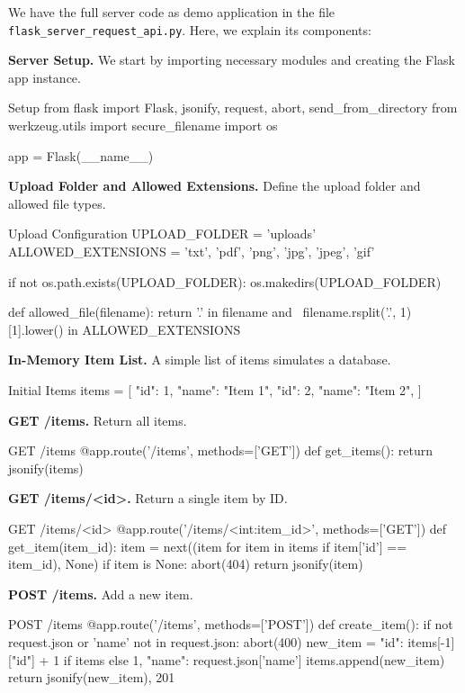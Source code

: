 We have the full server code as demo application in the file \texttt{flask\_server\_request\_api.py}. Here, we explain its components: 

{\bf Server Setup.} We start by importing necessary modules and creating the Flask app instance.

\begin{codeonly}{Setup}
from flask import Flask, jsonify, request, abort, send_from_directory
from werkzeug.utils import secure_filename
import os

app = Flask(__name__)
\end{codeonly}

{\bf Upload Folder and Allowed Extensions.} Define the upload folder and allowed file types.

\begin{codeonly}{Upload Configuration}
UPLOAD_FOLDER = 'uploads'
ALLOWED_EXTENSIONS = {'txt', 'pdf', 'png', 'jpg', 'jpeg', 'gif'}

if not os.path.exists(UPLOAD_FOLDER):
    os.makedirs(UPLOAD_FOLDER)

def allowed_file(filename):
    return '.' in filename and \
           filename.rsplit('.', 1)[1].lower() in ALLOWED_EXTENSIONS
\end{codeonly}

{\bf In-Memory Item List.} A simple list of items simulates a database.

\begin{codeonly}{Initial Items}
items = [
    {"id": 1, "name": "Item 1"},
    {"id": 2, "name": "Item 2"},
]
\end{codeonly}

{\bf GET /items.} Return all items.

\begin{codeonly}{GET /items}
@app.route('/items', methods=['GET'])
def get_items():
    return jsonify(items)
\end{codeonly}

{\bf GET /items/<id>.} Return a single item by ID.

\begin{codeonly}{GET /items/<id>}
@app.route('/items/<int:item_id>', methods=['GET'])
def get_item(item_id):
    item = next((item for item in items if item['id'] == item_id), None)
    if item is None:
        abort(404)
    return jsonify(item)
\end{codeonly}

{\bf POST /items.} Add a new item.

\begin{codeonly}{POST /items}
@app.route('/items', methods=['POST'])
def create_item():
    if not request.json or 'name' not in request.json:
        abort(400)
    new_item = {
        "id": items[-1]["id"] + 1 if items else 1,
        "name": request.json['name']
    }
    items.append(new_item)
    return jsonify(new_item), 201
\end{codeonly}

